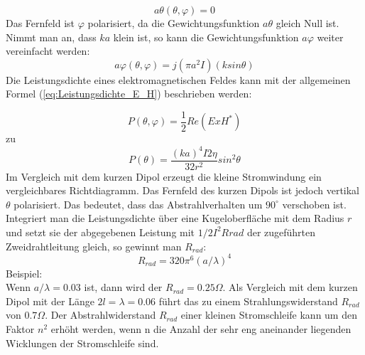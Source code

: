 \begin{equation}\label{GewichtungsfunktionLoop_aTheta}
a\theta(\theta, \varphi) =0
\end{equation}
Das Fernfeld ist $\varphi$ polarisiert, da die Gewichtungsfunktion $a\theta$ gleich Null ist. Nimmt man an, dass $ka$ klein ist, so kann die Gewichtungsfunktion $a\varphi$ weiter vereinfacht werden:
\begin{equation}
a\varphi(\theta,\varphi)=j(\pi a^{2}I)(k sin \theta)
\end{equation}
Die Leistungsdichte eines elektromagnetischen Feldes kann mit der allgemeinen Formel (\ref{eq:Leistungsdichte_E_H}) beschrieben werden: 

\begin{equation}
P(\theta,\varphi)=\frac{1}{2}Re(E x H^*)
\label{eq:Leistungsdichte_E_H}
\end{equation}
zu
\begin{equation}
P(\theta)=\frac{(ka)^{4}I{2}\eta}{32r^{2}}sin^{2}\theta
\end{equation}
Im Vergleich mit dem kurzen Dipol erzeugt die kleine Stromwindung ein vergleichbares Richtdiagramm. Das Fernfeld des kurzen Dipols ist jedoch vertikal $\theta$ polarisiert. Das bedeutet, dass das Abstrahlverhalten um $90^\circ$ verschoben ist. Integriert man die Leistungsdichte über eine Kugeloberfläche mit dem Radius $r$  und setzt sie der abgegebenen Leistung mit $1/2 I^{2}Rrad $ der zugeführten Zweidrahtleitung gleich, so gewinnt man $R_{rad}$:
\begin{equation}
R_{rad} = 320\pi^{6} (a/\lambda)^{4}\label{eq:RradLoop}
\end{equation}
Beispiel:\\
Wenn $a/\lambda = 0.03$ ist, dann wird der $R_{rad} = 0.25\Omega$. Als Vergleich mit dem kurzen Dipol mit der Länge $2l=\lambda= 0.06$ führt das zu einem Strahlungswiderstand $R_{rad}$ von $0.7\Omega$.  Der Abstrahlwiderstand $R_{rad}$ einer kleinen Stromschleife kann um den Faktor $n^{2}$ erhöht werden, wenn n die Anzahl der sehr eng aneinander liegenden Wicklungen der Stromschleife sind. 



